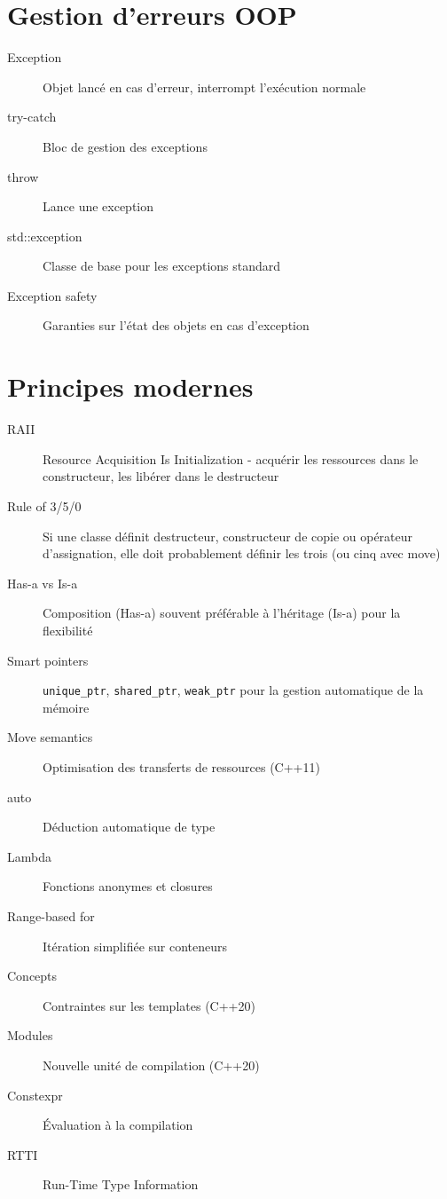 \documentclass{article}
\begin{document}
\begin{multicols*}{3}
\section*{Gestion d'erreurs OOP}
\begin{description}
\item[Exception] Objet lancé en cas d'erreur, interrompt l'exécution normale
\item[try-catch] Bloc de gestion des exceptions
\item[throw] Lance une exception
\item[std::exception] Classe de base pour les exceptions standard
\item[Exception safety] Garanties sur l'état des objets en cas d'exception
\end{description}

\section*{Principes modernes}
\begin{description}
\item[RAII] Resource Acquisition Is Initialization - acquérir les ressources dans le constructeur, les libérer dans le destructeur
\item[Rule of 3/5/0] Si une classe définit destructeur, constructeur de copie ou opérateur d'assignation, elle doit probablement définir les trois (ou cinq avec move)
\item[Has-a vs Is-a] Composition (Has-a) souvent préférable à l'héritage (Is-a) pour la flexibilité
\item[Smart pointers] \texttt{unique\_ptr}, \texttt{shared\_ptr}, \texttt{weak\_ptr} pour la gestion automatique de la mémoire
\item[Move semantics] Optimisation des transferts de ressources (C++11)
\item[auto] Déduction automatique de type
\item[Lambda] Fonctions anonymes et closures
\item[Range-based for] Itération simplifiée sur conteneurs
\item[Concepts] Contraintes sur les templates (C++20)
\item[Modules] Nouvelle unité de compilation (C++20)
\item[Constexpr] Évaluation à la compilation
\item[RTTI] Run-Time Type Information
\end{description}


\end{multicols*}
\end{document}
